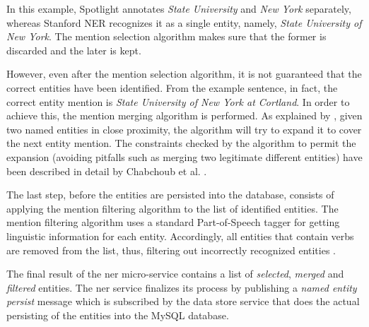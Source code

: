 In this example, Spotlight annotates \textit{State University} and \textit{New York}
 separately, whereas Stanford NER recognizes it as a single entity, namely, \textit{State University of New York}. The mention selection algorithm makes sure that the former is discarded and the later is kept. 
 
 However, even after the mention selection algorithm, it is not guaranteed that the correct entities have been identified. From the example sentence, in fact, the correct entity mention is \textit{State University of New York at Cortland}. In order to achieve this, the mention merging algorithm is performed. As explained by \cite{39}, given two named entities in close proximity, the algorithm will try to expand it to cover the next entity mention. The constraints checked by the algorithm to permit the expansion (avoiding pitfalls such as merging two legitimate different entities) have been described in detail by Chabchoub et al. \cite{39}. 
 
 The last step, before the entities are persisted into the database, consists of applying the mention filtering algorithm to the list of identified entities. The mention filtering algorithm uses a standard Part-of-Speech tagger for getting linguistic information for each entity. Accordingly, all entities that contain verbs are removed from the list, thus, filtering out incorrectly recognized entities \cite{39}. 
 
 The final result of the \ac{ner} micro-service contains a list of \textit{selected}, \textit{merged} and \textit{filtered} entities. The \ac{ner} service finalizes its process by publishing a \textit{named entity persist} message which is subscribed by the data store service that does the actual persisting of the entities into the MySQL database.